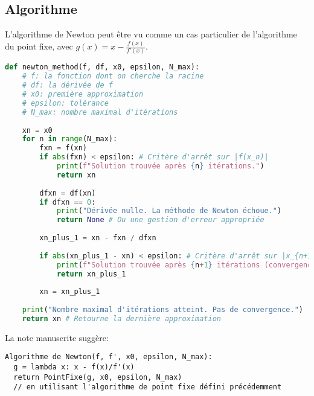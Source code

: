 \subsection{Algorithme}
\label{ssec:newton_algorithme}
L'algorithme de Newton peut être vu comme un cas particulier de l'algorithme du point fixe, avec $g(x) = x - \frac{f(x)}{f'(x)}$.
\begin{lstlisting}[language=Python, caption=Pseudo-code pour la méthode de Newton, basicstyle=\ttfamily\footnotesize, breaklines=true]
def newton_method(f, df, x0, epsilon, N_max):
    # f: la fonction dont on cherche la racine
    # df: la dérivée de f
    # x0: première approximation
    # epsilon: tolérance
    # N_max: nombre maximal d'itérations
    
    xn = x0
    for n in range(N_max):
        fxn = f(xn)
        if abs(fxn) < epsilon: # Critère d'arrêt sur |f(x_n)|
            print(f"Solution trouvée après {n} itérations.")
            return xn
        
        dfxn = df(xn)
        if dfxn == 0:
            print("Dérivée nulle. La méthode de Newton échoue.")
            return None # Ou une gestion d'erreur appropriée
            
        xn_plus_1 = xn - fxn / dfxn
        
        if abs(xn_plus_1 - xn) < epsilon: # Critère d'arrêt sur |x_{n+1}-x_n|
            print(f"Solution trouvée après {n+1} itérations (convergence sur x).")
            return xn_plus_1
            
        xn = xn_plus_1
        
    print("Nombre maximal d'itérations atteint. Pas de convergence.")
    return xn # Retourne la dernière approximation
\end{lstlisting}
La note manuscrite suggère:
\begin{verbatim}
Algorithme de Newton(f, f', x0, epsilon, N_max):
  g = lambda x: x - f(x)/f'(x)
  return PointFixe(g, x0, epsilon, N_max) 
  // en utilisant l'algorithme de point fixe défini précédemment
\end{verbatim}

